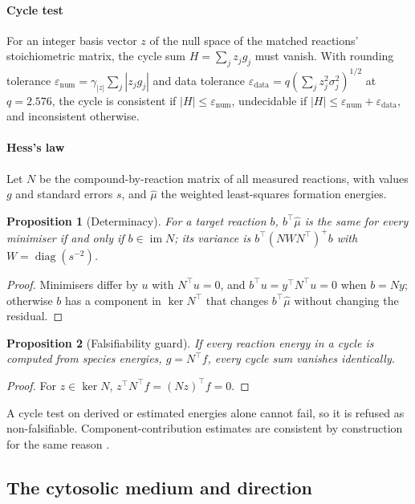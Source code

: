 \documentclass[5p]{elsarticle}
\theoremstyle{definition}
\theoremstyle{plain}
\newtheorem{proposition}{Proposition}
\newcommand{\st}[1]{\textsf{#1}}            %
\newcommand{\im}{\operatorname{im}}
\begin{document}
\paragraph{Cycle test}
For an integer basis vector $z$ of the null space of the matched reactions' stoichiometric matrix, the cycle sum $H=\sum_jz_jg_j$ must vanish.
With rounding tolerance $\varepsilon_{\mathrm{num}}=\gamma_{|z|}\sum_j|z_jg_j|$ \citep{higham2002accuracy} and data tolerance $\varepsilon_{\mathrm{data}}=q(\sum_jz_j^2\sigma_j^2)^{1/2}$ at $q=2.576$, the cycle is consistent if $|H|\le\varepsilon_{\mathrm{num}}$, \st{undecidable} if $|H|\le\varepsilon_{\mathrm{num}}+\varepsilon_{\mathrm{data}}$, and inconsistent otherwise.

\paragraph{Hess's law}
Let $N$ be the compound-by-reaction matrix of all measured reactions, with values $g$ and standard errors $s$, and $\hat\mu$ the weighted least-squares formation energies.

\begin{proposition}[Determinacy]
\label{prop:hess}
For a target reaction $b$, $b^\top\hat\mu$ is the same for every minimiser if and only if $b\in\im N$; its variance is $b^\top(NWN^\top)^+b$ with $W=\operatorname{diag}(s^{-2})$.
\end{proposition}
\begin{proof}
Minimisers differ by $u$ with $N^\top u=0$, and $b^\top u=y^\top N^\top u=0$ when $b=Ny$; otherwise $b$ has a component in $\ker N^\top$ that changes $b^\top\hat\mu$ without changing the residual.
\end{proof}

\begin{proposition}[Falsifiability guard]
\label{prop:falsifiable}
If every reaction energy in a cycle is computed from species energies, $g=N^\top f$, every cycle sum vanishes identically.
\end{proposition}
\begin{proof}
For $z\in\ker N$, $z^\top N^\top f=(Nz)^\top f=0$.
\end{proof}

A cycle test on derived or estimated energies alone cannot fail, so it is \st{refused} as non-falsifiable.
Component-contribution estimates are consistent by construction for the same reason \citep{noor2013component}.

\subsection{The cytosolic medium and direction}
\label{sec:legendre}
\end{document}
